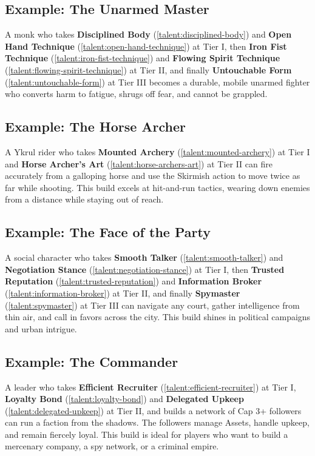 {{\subsection*{Example: The Unarmed Master}
\label{sec:unarmed-master-example}
A monk who takes \textbf{Disciplined Body} (\ref{talent:disciplined-body}) and \textbf{Open Hand Technique} (\ref{talent:open-hand-technique}) at Tier I, then \textbf{Iron Fist Technique} (\ref{talent:iron-fist-technique}) and \textbf{Flowing Spirit Technique} (\ref{talent:flowing-spirit-technique}) at Tier II, and finally \textbf{Untouchable Form} (\ref{talent:untouchable-form}) at Tier III becomes a durable, mobile unarmed fighter who converts harm to fatigue, shrugs off fear, and cannot be grappled.

\subsection*{Example: The Horse Archer}
\label{sec:horse-archer-example}
A Ykrul rider who takes \textbf{Mounted Archery} (\ref{talent:mounted-archery}) at Tier I and \textbf{Horse Archer's Art} (\ref{talent:horse-archers-art}) at Tier II can fire accurately from a galloping horse and use the Skirmish action to move twice as far while shooting. This build excels at hit-and-run tactics, wearing down enemies from a distance while staying out of reach.

\subsection*{Example: The Face of the Party}
\label{sec:face-example}
A social character who takes \textbf{Smooth Talker} (\ref{talent:smooth-talker}) and \textbf{Negotiation Stance} (\ref{talent:negotiation-stance}) at Tier I, then \textbf{Trusted Reputation} (\ref{talent:trusted-reputation}) and \textbf{Information Broker} (\ref{talent:information-broker}) at Tier II, and finally \textbf{Spymaster} (\ref{talent:spymaster}) at Tier III can navigate any court, gather intelligence from thin air, and call in favors across the city. This build shines in political campaigns and urban intrigue.

\subsection*{Example: The Commander}
\label{sec:commander-example}
A leader who takes \textbf{Efficient Recruiter} (\ref{talent:efficient-recruiter}) at Tier I, \textbf{Loyalty Bond} (\ref{talent:loyalty-bond}) and \textbf{Delegated Upkeep} (\ref{talent:delegated-upkeep}) at Tier II, and builds a network of Cap 3+ followers can run a faction from the shadows. The followers manage Assets, handle upkeep, and remain fiercely loyal. This build is ideal for players who want to build a mercenary company, a spy network, or a criminal empire.

}}
